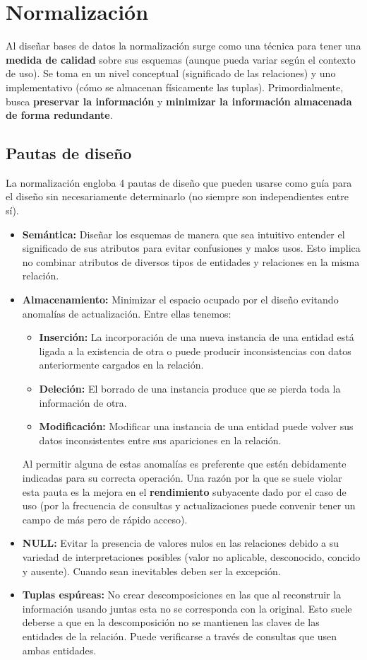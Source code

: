\section*{Normalización}
Al diseñar bases de datos la normalización surge como una técnica para tener una \textbf{medida de calidad} sobre sus esquemas (aunque pueda variar según el contexto de uso). Se toma en un nivel conceptual (significado de las relaciones) y uno implementativo (cómo se almacenan físicamente las tuplas). Primordialmente, busca \textbf{preservar la información} y \textbf{minimizar la información almacenada de forma redundante}.

\subsection*{Pautas de diseño}
La normalización engloba 4 pautas de diseño que pueden usarse como guía para el diseño sin necesariamente determinarlo (no siempre son independientes entre sí).
\begin{itemize}
    \item \textbf{Semántica:} Diseñar los esquemas de manera que sea intuitivo entender el significado de sus atributos para evitar confusiones y malos usos. Esto implica no combinar atributos de diversos tipos de entidades y relaciones en la misma relación.
    \item \textbf{Almacenamiento:} Minimizar el espacio ocupado por el diseño evitando anomalías de actualización. Entre ellas tenemos:
    \begin{itemize}
        \item \textbf{Inserción:} La incorporación de una nueva instancia de una entidad está ligada a la existencia de otra o puede producir inconsistencias con datos anteriormente cargados en la relación.
        \item \textbf{Deleción:} El borrado de una instancia produce que se pierda toda la información de otra.
        \item \textbf{Modificación:} Modificar una instancia de una entidad puede volver sus datos inconsistentes entre sus apariciones en la relación.
    \end{itemize}
    Al permitir alguna de estas anomalías es preferente que estén debidamente indicadas para su correcta operación. Una razón por la que se suele violar esta pauta es la mejora en el \textbf{rendimiento} subyacente dado por el caso de uso (por la frecuencia de consultas y actualizaciones puede convenir tener un campo de más pero de rápido acceso).
    \item \textbf{NULL:} Evitar la presencia de valores nulos en las relaciones debido a su variedad de interpretaciones posibles (valor no aplicable, desconocido, concido y ausente). Cuando sean inevitables deben ser la excepción.
    \item \textbf{Tuplas espúreas:} No crear descomposiciones en las que al reconstruir la información usando juntas esta no se corresponda con la original. Esto suele deberse a que en la descomposición no se mantienen las claves de las entidades de la relación. Puede verificarse a través de consultas que usen ambas entidades.
\end{itemize}

